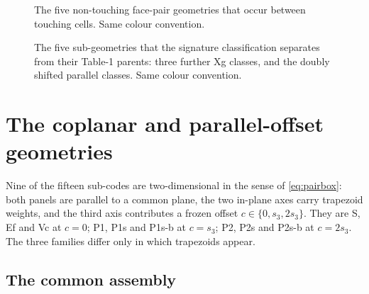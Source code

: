 \documentclass[11pt]{article}
\theoremstyle{remark}
\begin{document}
\begin{figure}[htbp]

\caption{The five non-touching face-pair geometries that occur between touching cells.
Same colour convention.}
\label{fig:shell}
\end{figure}

\begin{figure}[htbp]

\caption{The five sub-geometries that the signature classification separates from their
Table-1 parents: three further Xg classes, and the doubly shifted parallel classes.
Same colour convention.}
\label{fig:extra}
\end{figure}

\section{The coplanar and parallel-offset geometries}
\label{sec:cop}

Nine of the fifteen sub-codes are two-dimensional in the sense of \eqref{eq:pairbox}: both
panels are parallel to a common plane, the two in-plane axes carry trapezoid weights, and
the third axis contributes a frozen offset $c \in \{0, s_3, 2s_3\}$. They are S, Ef and Vc
at $c = 0$; P1, P1s and P1s-b at $c = s_3$; P2, P2s and P2s-b at $c = 2s_3$. The three
families differ only in which trapezoids appear.

\subsection{The common assembly}
\label{sec:copasm}
\end{document}
